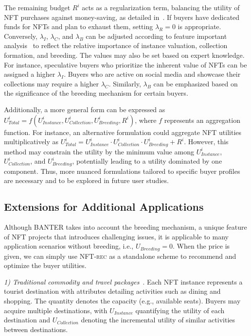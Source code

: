 \documentclass[conference]{IEEEtran}
\theoremstyle{plain}
\begin{document}
{The remaining budget $R^i$ acts as a regularization term, balancing the utility of NFT purchases against money-saving, as detailed in~\cite{zhang2022price}. If buyers have dedicated funds for NFTs and plan to exhaust them, setting $\lambda_{R}=0$ is appropriate. Conversely, $\lambda_{I}$, $\lambda_{C}$, and $\lambda_{B}$ can be adjusted according to feature important analysis~\cite{altmann2010permutation, chen2023algorithms} to reflect the relative importance of instance valuation, collection formation, and breeding. The values may also be set based on expert knowledge. For instance, speculative buyers who prioritize the inherent value of NFTs can be assigned a higher $\lambda_{I}$. Buyers who are active on social media and showcase their collections may require a higher $\lambda_{C}$. Similarly, $\lambda_{B}$ can be emphasized based on the significance of the breeding mechanism for certain buyers.

Additionally, a more general form can be expressed as $U^i_\textit{Total} = f(U^i_\textit{Instance}, U^i_\textit{Collection}, U^i_\textit{Breeding}, R^i)$, where $f$ represents an aggregation function. For instance, an alternative formulation could aggregate NFT utilities multiplicatively as $U^i_\textit{Total} = U^i_\textit{Instance} \cdot U^i_\textit{Collection} \cdot U^i_\textit{Breeding} + R^i$. However, this method may constrain the utility by the minimum value among $U^i_\textit{Instance}$, $U^i_\textit{Collection}$, and $U^i_\textit{Breeding}$, potentially leading to a utility dominated by one component. Thus, more nuanced formulations tailored to specific buyer profiles are necessary and to be explored in future user studies.

\subsection{Extensions for Additional Applications}
\label{appsubsec:extension-application}
    Although BANTER\xspace takes into account the breeding mechanism, a unique feature of NFT projects that introduces challenging issues, it is applicable to many application scenarios without breeding, i.e., $U_\textit{Breeding}=0$. When the price is given, we can simply use \textsc{NFT-rec}\xspace as a standalone scheme to recommend and optimize the buyer utilities. 
    
    \textit{1) Traditional commodity and travel packages}~\cite{chen2013travel, liu2011personalized, ge2011cost}. Each NFT instance represents a tourist destination with attributes detailing activities such as dining and shopping. The quantity denotes the capacity (e.g., available seats). Buyers may acquire multiple destinations, with $U_\textit{Instance}$ quantifying the utility of each destination and $U_\textit{Collection}$ denoting the incremental utility of similar activities between destinations. 
    
}
\end{document}
